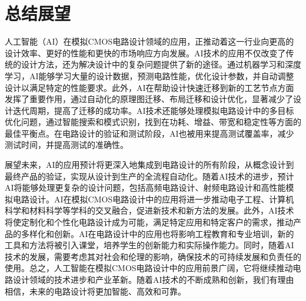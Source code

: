 %
%
%
%
%

\chapter{总结展望}

人工智能（AI）在模拟CMOS电路设计领域的应用，正推动着这一行业向更高的设计效率、更好的性能和更快的市场响应方向发展。AI技术的应用不仅改变了传统的设计方法，还为解决设计中的复杂问题提供了新的途径。通过机器学习和深度学习，AI能够学习大量的设计数据，预测电路性能，优化设计参数，并自动调整设计以满足特定的性能要求。此外，AI在帮助设计快速迁移到新的工艺节点方面发挥了重要作用，通过自动化的原理图迁移、布局迁移和设计优化，显著减少了设计迭代周期，提高了迁移的成功率。AI技术还能够处理模拟电路设计中的多目标优化问题，通过智能搜索和模式识别，找到在功耗、增益、带宽和稳定性等方面的最佳平衡点。在电路设计的验证和测试阶段，AI也被用来提高测试覆盖率，减少测试时间，并提高测试的准确性。

展望未来，AI的应用预计将更深入地集成到电路设计的所有阶段，从概念设计到最终产品的验证，实现从设计到生产的全流程自动化。随着AI技术的进步，预计AI将能够处理更复杂的设计问题，包括高频电路设计、射频电路设计和高性能模拟电路设计。AI在模拟CMOS电路设计中的应用将进一步推动电子工程、计算机科学和材料科学等学科的交叉融合，促进新技术和新方法的发展。此外，AI技术将使定制化和个性化电路设计成为可能，满足特定应用和特定客户的需求，推动产品的多样化和创新。AI在电路设计中的应用也将影响工程教育和专业培训，新的工具和方法将被引入课堂，培养学生的创新能力和实际操作能力。同时，随着AI技术的发展，需要考虑其对社会和伦理的影响，确保技术的可持续发展和负责任的使用。总之，人工智能在模拟CMOS电路设计中的应用前景广阔，它将继续推动电路设计领域的技术进步和产业革新。随着AI技术的不断成熟和创新，我们有理由相信，未来的电路设计将更加智能、高效和可靠。
